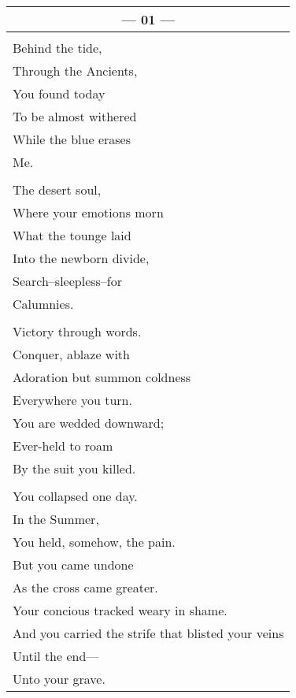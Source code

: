 \documentclass{article}
\begin{document}
\begin{center}
\begin{tabular}{l}
\multicolumn{1}{c}{\textbf{--- 01 ---}} \\ \hline
\\
Behind the tide, \\
Through the Ancients, \\
You found today \\
To be almost withered \\
While the blue erases \\
Me. \\
\\
The desert soul, \\
Where your emotions morn \\
What the tounge laid \\
Into the newborn divide, \\
Search--sleepless--for \\
Calumnies. \\
\\
Victory through words. \\
Conquer, ablaze with \\
Adoration but summon coldness \\
Everywhere you turn. \\
You are wedded downward; \\
Ever-held to roam \\
By the suit you killed. \\
\\
You collapsed one day. \\
In the Summer, \\
You held, somehow, the pain. \\
But you came undone \\
As the cross came greater. \\
Your concious tracked weary in shame. \\
And you carried the strife that blisted your veins \\
Until the end--- \\
Unto your grave.
\end{tabular}
\end{center}

\newpage
\end{document}
